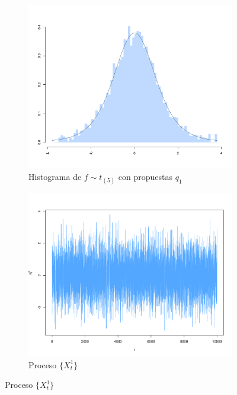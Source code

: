 \documentclass[11pt,a4paper]{article}
\begin{document}
\begin{figure}[!p]
    \centering
    \begin{subfigure}[t]{0.45\textwidth}
        \centering
        \includegraphics[width=\linewidth]{mh_hist_x1.png} 
        \caption{Histograma de $f \sim t_{(5)}$ con propuestas $q_1$} \label{fig:mh_hist_x1}
    \end{subfigure}
    \hfill
    \begin{subfigure}[t]{0.45\textwidth}
        \centering
        \includegraphics[width=\linewidth]{mh_chain_x1.png} 
        \caption{Proceso $\lbrace X_t^1 \rbrace$} \label{fig:mh_chain_x1}
    \end{subfigure}


\end{figure}
\end{document}
